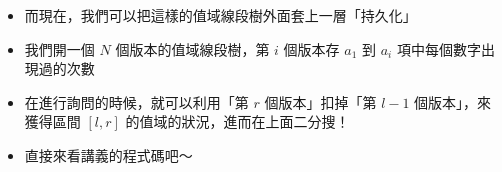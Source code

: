\documentclass[standalone]{beamer}
\begin{document}
\begin{frame}[fragile]{}
  \begin{itemize}
    \item 而現在，我們可以把這樣的值域線段樹外面套上一層「持久化」
    \item 我們開一個 $N$ 個版本的值域線段樹，第 $i$ 個版本存 $a_1$ 到 $a_i$ 項中每個數字出現過的次數
    \item 在進行詢問的時候，就可以利用「第 $r$ 個版本」扣掉「第 $l - 1$ 個版本」，來獲得區間 $[l, r]$ 的值域的狀況，進而在上面二分搜！
    \item 直接來看講義的程式碼吧～
  \end{itemize}
\end{frame}
\end{document}
